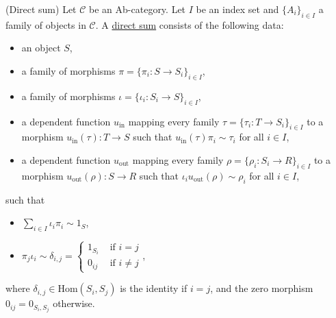 \begin{definition}{(Direct sum)}\label{def:direct_sum}
Let $\mathcal{C}$ be an Ab-category. Let $I$ be an index set and $\{A_{i}\}_{i\in I}$ a family of objects in $\mathcal{C}$.
A \ul{direct sum} consists of the following data:
\begin{itemize}
\item an object $S$,
\item a family of morphisms $\pi = \{ \pi_{i} : S \rightarrow S_{i} \}_{i\in I}$,
\item a family of morphisms $\iota = \{ \iota_{i} : S_{i} \rightarrow S \}_{i\in I}$,
\item a dependent function $u_{\text{in}}$ mapping every family $\tau = \{ \tau_{i} : T \rightarrow S_{i} \}_{i\in I}$ to a morphism
$u_{\text{in}}(\tau) : T \rightarrow S$ such that $u_{\text{in}}(\tau) \pi_{i} \sim \tau_{i}$ for all $i \in I$,
\item a dependent function $u_{\text{out}}$ mapping every family $\rho = \{ \rho_{i} : S_{i} \rightarrow R \}_{i\in I}$ to a morphism
$u_{\text{out}}(\rho) : S \rightarrow R$ such that $\iota_{i} u_{\text{out}}(\rho) \sim \rho_{i}$ for all $i \in I$,
\end{itemize}
such that
\begin{itemize}
\item $\sum_{i\in I} \iota_{i} \pi_{i} \sim 1_{S}$,
\item $\pi_{j} \iota_{i} \sim \delta_{i, j} =  \begin{cases}
            1_{S_{i}} & \text{ if } i = j  \\
            0_{ij} & \text{ if } i \neq j
        \end{cases}$,
\end{itemize}
where $\delta_{i, j} \in \mathrm{Hom}(S_{i}, S_{j})$ is the identity if $i = j$, and the zero morphism $0_{ij} = 0_{S_{i}, S_{j}}$ otherwise.
\end{definition}

